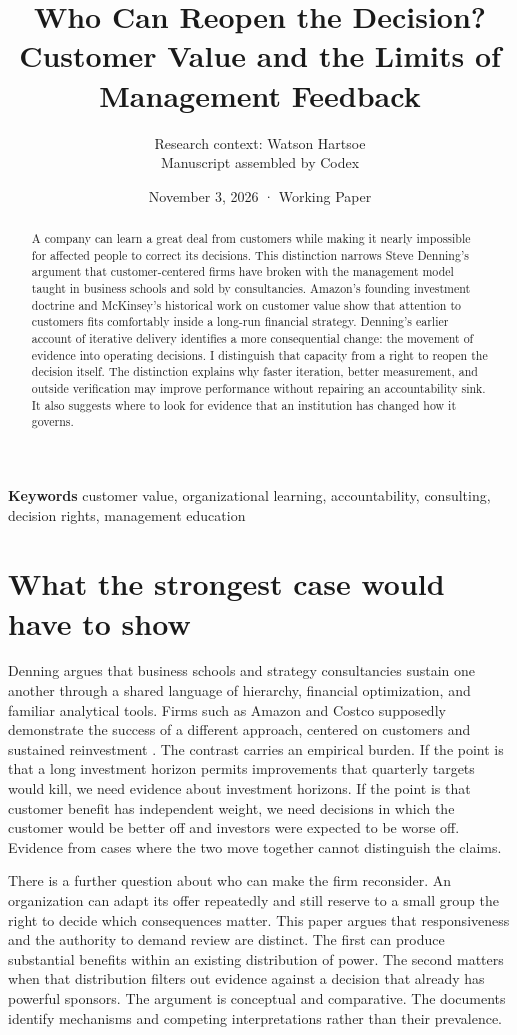 \documentclass[11pt]{article}
\title{Who Can Reopen the Decision?\\\large Customer Value and the Limits of Management Feedback}
\author{Research context: Watson Hartsoe\\Manuscript assembled by Codex}
\date{November 3, 2026 · Working Paper}
\begin{document}
\maketitle
\begin{abstract}
A company can learn a great deal from customers while making it nearly impossible for affected people to correct its decisions. This distinction narrows Steve Denning's argument that customer-centered firms have broken with the management model taught in business schools and sold by consultancies. Amazon's founding investment doctrine and McKinsey's historical work on customer value show that attention to customers fits comfortably inside a long-run financial strategy. Denning's earlier account of iterative delivery identifies a more consequential change: the movement of evidence into operating decisions. I distinguish that capacity from a right to reopen the decision itself. The distinction explains why faster iteration, better measurement, and outside verification may improve performance without repairing an accountability sink. It also suggests where to look for evidence that an institution has changed how it governs.
\end{abstract}
\noindent\textbf{Keywords} customer value, organizational learning, accountability, consulting, decision rights, management education

\section{What the strongest case would have to show}
Denning argues that business schools and strategy consultancies sustain one another through a shared language of hierarchy, financial optimization, and familiar analytical tools. Firms such as Amazon and Costco supposedly demonstrate the success of a different approach, centered on customers and sustained reinvestment \citep{denning2026businessschools}. The contrast carries an empirical burden. If the point is that a long investment horizon permits improvements that quarterly targets would kill, we need evidence about investment horizons. If the point is that customer benefit has independent weight, we need decisions in which the customer would be better off and investors were expected to be worse off. Evidence from cases where the two move together cannot distinguish the claims.

There is a further question about who can make the firm reconsider. An organization can adapt its offer repeatedly and still reserve to a small group the right to decide which consequences matter. This paper argues that responsiveness and the authority to demand review are distinct. The first can produce substantial benefits within an existing distribution of power. The second matters when that distribution filters out evidence against a decision that already has powerful sponsors. The argument is conceptual and comparative. The documents identify mechanisms and competing interpretations rather than their prevalence.
\end{document}
